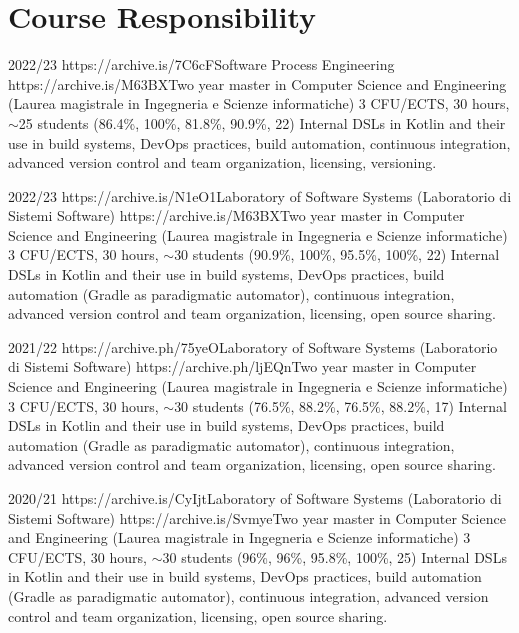 \section{Course Responsibility}
\vspace{-2em}
\begin{outerlist}
    \item[2022/23]
        \unibocourse
        {https://archive.is/7C6cF}{Software Process Engineering}
        {https://archive.is/M63BX}{Two year master in Computer Science and Engineering (Laurea magistrale in Ingegneria e Scienze informatiche)}
        {3 CFU/ECTS, 30 hours, $\sim$25 students}
        {(86.4\%, 100\%, 81.8\%, 90.9\%, 22)}
        {Internal DSLs in Kotlin and their use in build systems, DevOps practices, build automation, continuous integration, advanced version control and team organization, licensing, versioning.}
    \item[2022/23]
        \unibocourse
        {https://archive.is/N1eO1}{Laboratory of Software Systems (Laboratorio di Sistemi Software)}
        {https://archive.is/M63BX}{Two year master in Computer Science and Engineering (Laurea magistrale in Ingegneria e Scienze informatiche)}
        {3 CFU/ECTS, 30 hours, $\sim$30 students}
        {(90.9\%, 100\%, 95.5\%, 100\%, 22)}
        {Internal DSLs in Kotlin and their use in build systems, DevOps practices, build automation (Gradle as paradigmatic automator), continuous integration, advanced version control and team organization, licensing, open source sharing.}
    \item[2021/22]
        \unibocourse
        {https://archive.ph/75yeO}{Laboratory of Software Systems (Laboratorio di Sistemi Software)}
        {https://archive.ph/ljEQn}{Two year master in Computer Science and Engineering (Laurea magistrale in Ingegneria e Scienze informatiche)}
        {3 CFU/ECTS, 30 hours, $\sim$30 students}
        {(76.5\%, 88.2\%, 76.5\%, 88.2\%, 17)}
        {Internal DSLs in Kotlin and their use in build systems, DevOps practices, build automation (Gradle as paradigmatic automator), continuous integration, advanced version control and team organization, licensing, open source sharing.}
    \item[2020/21]
        \unibocourse
        {https://archive.is/CyIjt}{Laboratory of Software Systems (Laboratorio di Sistemi Software)}
        {https://archive.is/Svmye}{Two year master in Computer Science and Engineering (Laurea magistrale in Ingegneria e Scienze informatiche)}
        {3 CFU/ECTS, 30 hours, $\sim$30 students}
        {(96\%, 96\%, 95.8\%, 100\%, 25)}
        {Internal DSLs in Kotlin and their use in build systems, DevOps practices, build automation (Gradle as paradigmatic automator), continuous integration, advanced version control and team organization, licensing, open source sharing.}
\end{outerlist}

